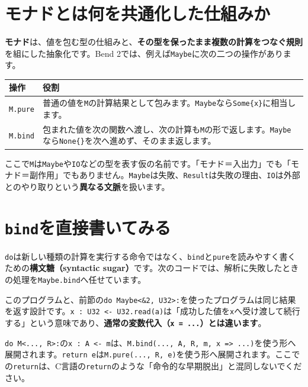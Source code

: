 \documentclass[11pt,a4paper,openany]{book}
\newcommand{\code}[1]{\texttt{#1}}
\newcommand{\term}[1]{\textbf{#1}}
\newcommand{\readcode}[2]{}
\begin{document}
\section{モナドとは何を共通化した仕組みか}
\term{モナド}は、値を包む型の仕組みと、\textbf{その型を保ったまま複数の計算をつなぐ規則}を組にした抽象化です。Bend 2では、例えば\code{Maybe}に次の二つの操作があります。

\begin{tabularx}{\linewidth}{@{}p{28mm}X@{}}
\toprule 操作 & 役割\\\midrule
\code{M.pure} & 普通の値を\code{M}の計算結果として包みます。\code{Maybe}なら\code{Some\{x\}}に相当します。\\
\code{M.bind} & 包まれた値を次の関数へ渡し、次の計算も\code{M}の形で返します。\code{Maybe}なら\code{None\{\}}を次へ進めず、そのまま返します。\\
\bottomrule
\end{tabularx}

ここで\code{M}は\code{Maybe}や\code{IO}などの型を表す仮の名前です。「モナド＝入出力」でも「モナド＝副作用」でもありません。\code{Maybe}は失敗、\code{Result}は失敗の理由、\code{IO}は外部とのやり取りという\textbf{異なる文脈}を扱います。

\section{\code{bind}を直接書いてみる}
\code{do}は新しい種類の計算を実行する命令ではなく、\code{bind}と\code{pure}を読みやすく書くための\term{構文糖（syntactic sugar）}です。次のコードでは、解析に失敗したときの処理を\code{Maybe.bind}へ任せています。
\readcode{30_monad_explicit.bend}{\code{Maybe.bind}を直接使う（30\_monad\_explicit.bend）}
このプログラムと、前節の\code{do Maybe<\&2, U32>:}を使ったプログラムは同じ結果を返す設計です。\code{x : U32 <- U32.read(a)}は「成功した値を\code{x}へ受け渡して続行する」という意味であり、\textbf{通常の変数代入（\code{x = ...}）とは違います}。

\begin{pointbox}
\code{do M<..., R>:}の\code{x : A <- m}は、\code{M.bind(..., A, R, m, x => ...)}を使う形へ展開されます。\code{return e}は\code{M.pure(..., R, e)}を使う形へ展開されます。ここでの\code{return}は、C言語の\code{return}のような「命令的な早期脱出」と混同しないでください。
\end{pointbox}
\end{document}
